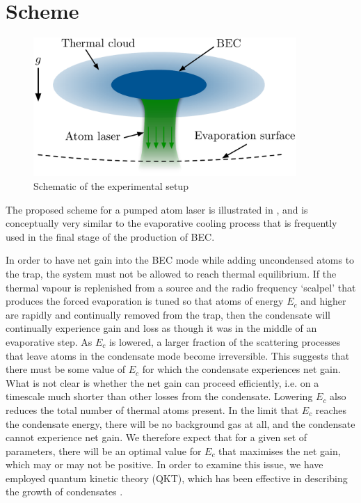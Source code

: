 \section{Scheme}

\begin{figure}
    \centering
        \includegraphics[width=10cm]{QKTScheme}
    \caption{Schematic of the experimental setup}
    \label{KineticTheory:QKTScheme}
\end{figure}


The proposed scheme for a pumped atom laser is illustrated in , and is conceptually very similar to the evaporative cooling process that is frequently used in the final stage of the production of BEC. 






In order to have net gain into the BEC mode while adding uncondensed atoms to the trap, the system must not be allowed to reach thermal equilibrium. If the thermal vapour is replenished from a source and the radio frequency `scalpel' that produces the forced evaporation is tuned so that atoms of energy $E_c$ and higher are rapidly and continually removed from the trap, then the condensate will continually experience gain and loss as though it was in the middle of an evaporative step. As $E_c$ is lowered, a larger fraction of the scattering processes that leave atoms in the condensate mode become irreversible. This suggests that there must be some value of $E_c$ for which the condensate experiences net gain. What is not clear is whether the net gain can proceed efficiently, i.e. on a timescale much shorter than other losses from the condensate. Lowering $E_c$ also reduces the total number of thermal atoms present. In the limit that $E_c$ reaches the condensate energy, there will be no background gas at all, and the condensate cannot experience net gain. We therefore expect that for a given set of parameters, there will be an optimal value for $E_c$ that maximises the net gain, which may or may not be positive. In order to examine this issue, we have employed quantum kinetic theory (QKT), which has been effective in describing the growth of condensates \citep{Davis:2000vn,Bijlsma:2000}.

